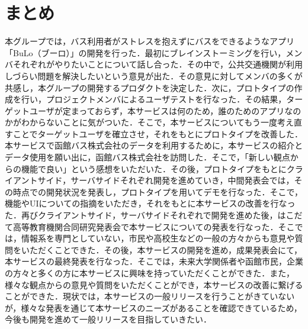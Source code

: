 \chapter{まとめ}
本グループでは，バス利用者がストレスを抱えずにバスをできるようなアプリ「BuLo（ブーロ）」の開発を行った．最初にブレインストーミングを行い，メンバそれぞれがやりたいことについて話し合った．その中で，公共交通機関が利用しづらい問題を解決したいという意見が出た．その意見に対してメンバの多くが共感し，本グループの開発するプロダクトを決定した．次に，プロトタイプの作成を行い，プロジェクトメンバによるユーザテストを行なった．その結果，ターゲットユーザが定まっておらず，本サービスは何のため，誰のためのアプリなのかがわからないことに気がついた．そこで，本サービスについてもう一度考え直すことでターゲットユーザを確立させ，それをもとにプロトタイプを改善した．本サービスで函館バス株式会社のデータを利用するために，本サービスの紹介とデータ使用を願い出に，函館バス株式会社を訪問した．そこで，「新しい観点からの機能で良い」という感想をいただいた．その後，プロトタイプをもとにクライアントサイド，サーバサイドそれぞれ開発を進めていき，中間発表会では，その時点での開発状況を発表し，プロトタイプを用いてデモを行なった．そこで，機能やUIについての指摘をいただき，それをもとに本サービスの改善を行なった．再びクライアントサイド，サーバサイドそれぞれで開発を進めた後，はこだて高等教育機関合同研究発表会で本サービスについての発表を行なった．そこでは，情報系を専門としていない，市民や高校生などの一般の方々からも意見や質問をいただくことできた．その後，本サービスの開発を進め，成果発表会にて，本サービスの最終発表を行なった．そこでは，未来大学関係者や函館市民，企業の方々と多くの方に本サービスに興味を持っていただくことができた．また，様々な観点からの意見や質問をいただくことができ，本サービスの改善に繋げることができた．現状では，本サービスの一般リリースを行うことがきていないが，様々な発表を通じて本サービスのニーズがあることを確認できているため，今後も開発を進めて一般リリースを目指していきたい．
